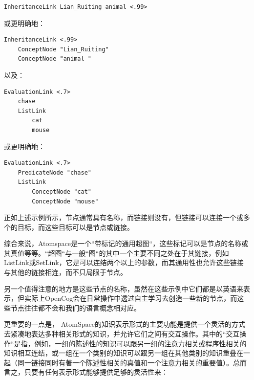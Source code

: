 {\tt\begin{small}\begin{lstlisting}
InheritanceLink Lian_Ruiting animal <.99>
\end{lstlisting}\end{small}}

\noindent 或更明确地：

 {\tt\begin{small}\begin{lstlisting}
InheritanceLink <.99>
	ConceptNode "Lian_Ruiting"
	ConceptNode "animal "
\end{lstlisting}\end{small}}

以及：

{\tt\begin{small}\begin{lstlisting}
EvaluationLink <.7>
	chase 
	ListLink
		cat
		mouse
\end{lstlisting}\end{small}}

\noindent 或更明确地：

{\tt\begin{small}\begin{lstlisting}
EvaluationLink <.7>
	PredicateNode "chase" 
	ListLink
		ConceptNode "cat"
		ConceptNode "mouse"
\end{lstlisting}\end{small}}

\noindent 正如上述示例所示，节点通常具有名称，而链接则没有，但链接可以连接一个或多个的目标，而这些目标可以是节点或链接。

综合来说，Atomspace是一个“带标记的通用超图“，这些标记可以是节点的名称或其真值等等。“超图“与一般“图“的其中一个主要不同之处在于其链接，例如ListLink或SetLink，它是可以连结两个以上的参数，而其通用性也允许这些链接与其他的链接相连，而不只局限于节点。

另一个值得注意的地方是这些节点的名称，虽然在这些示例中它们都是以英语来表示，但实际上OpenCog会在日常操作中透过自主学习去创造一些新的节点，而这些节点往往都不会和我们的语言概念相对应。

更重要的一点是， AtomSpace的知识表示形式的主要功能是提供一个灵活的方式去紧凑地表达多种相关形式的知识，并允许它们之间有交互操作。其中的“交互操作“是指，例如，一组的陈述性的知识可以跟另一组的注意力相关或程序性相关的知识相互连结，或一组在一个类别的知识可以跟另一组在其他类别的知识重叠在一起（同一链接同时有著一个陈述性相关的真值和一个注意力相关的重要值）。总而言之，只要有任何表示形式能够提供足够的灵活性来：

